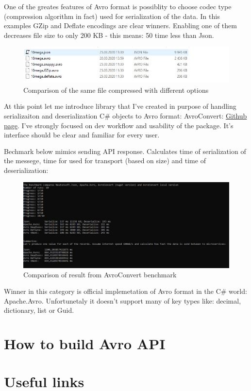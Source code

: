 \documentclass[]{article}
\begin{document}
One of the greates features of Avro format is possiblity to choose codec type (compression algorithm in fact) used for serialization of the data. In this examples GZip and Deflate encodings are clear winners. Enabling one of them decreases file size to only 200 KB - this means: 50 time less than Json.

\begin{figure}[h]
	\centering
	\includegraphics[width=\textwidth]{size_comparison}
	\caption{Comparison of the same file compressed with different options}
\end{figure}

At this point let me introduce library that I've created in purpose of handling serializaiton and deserialization C\# objects to Avro format: AvroConvert: 
\href{https://github.com/AdrianStrugala/AvroConvert}{Github page}.
I've strongly focused on dev workflow and usability of the package. It's interface should be clear and familiar for every user.  

Bechmark below mimics sending API response. Calculates time of serialization of the messege, time for used for transport (based on size) and time of deserialization: 

\begin{figure}[h]
	\centering
	\includegraphics[width=\textwidth]{benchmark}
	\caption{Comparison of result from AvroConvert benchmark}
\end{figure}

Winner in this category is official implemetation of Avro format in the C\# world: Apache.Avro. Unfortunetaly it doesn't support many of key types like: decimal, dictionary, list or Guid.


\section{How to build Avro API}

\section{Useful links}
\end{document}
